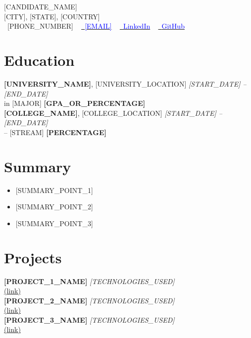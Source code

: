 \documentclass[letterpaper,10.5pt]{article}
\newcommand{\resumeItem}[1]{\item\small{#1}}
\newcommand{\resumeItemListStart}{\begin{itemize}[noitemsep,topsep=0pt,parsep=0pt,partopsep=0pt]}
\newcommand{\resumeItemListEnd}{\end{itemize}}
\begin{document}
\begin{center}
    {\Huge \scshape [CANDIDATE_NAME]} \\ \vspace{1pt}
    [CITY], [STATE], [COUNTRY] \\ \vspace{1pt}
    \small \faPhone\ [PHONE_NUMBER] ~ 
    \href{mailto:[EMAIL]}{\faEnvelope\ \textcolor{blue}{[EMAIL]}} ~ 
    \href{[LINKEDIN_URL]}{\faLinkedin\ \textcolor{blue}{LinkedIn}} ~
    \href{[GITHUB_URL]}{\faGithub\ \textcolor{blue}{GitHub}}
\end{center}

\section*{Education}
\noindent
\textbf{[UNIVERSITY_NAME]}, [UNIVERSITY_LOCATION] \hfill \textit{[START_DATE] -- [END_DATE]} \\
[DEGREE_NAME] in [MAJOR] \hfill \textbf{[GPA_OR_PERCENTAGE]} \\[6pt]

\noindent
\textbf{[COLLEGE_NAME]}, [COLLEGE_LOCATION] \hfill \textit{[START_DATE] -- [END_DATE]} \\
[DEGREE_TYPE] – [STREAM] \hfill \textbf{[PERCENTAGE]}

\section{Summary}
\resumeItemListStart
    \resumeItem{[SUMMARY_POINT_1]}
    \resumeItem{[SUMMARY_POINT_2]}
    \resumeItem{[SUMMARY_POINT_3]}
\resumeItemListEnd

\section*{Projects}
\noindent
\textbf{[PROJECT_1_NAME]} \textit{[TECHNOLOGIES_USED]} \\
[PROJECT_1_DESCRIPTION] \href{[PROJECT_1_LINK]}{(link)} \\[6pt]

\noindent
\textbf{[PROJECT_2_NAME]} \textit{[TECHNOLOGIES_USED]} \\
[PROJECT_2_DESCRIPTION] \href{[PROJECT_2_LINK]}{(link)} \\[6pt]

\noindent
\textbf{[PROJECT_3_NAME]} \textit{[TECHNOLOGIES_USED]} \\
[PROJECT_3_DESCRIPTION] \href{[PROJECT_3_LINK]}{(link)} \\[6pt]
\end{document}
